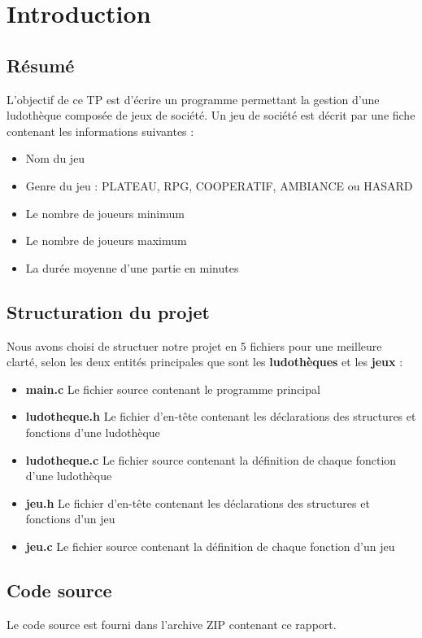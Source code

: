 \chapter{Introduction}
\section{Résumé}
L'objectif de ce TP est d'écrire un programme permettant la gestion d'une ludothèque composée de jeux de société. Un jeu de société est décrit par une fiche contenant les informations suivantes :
\begin{itemize}
  \item Nom du jeu
  \item Genre du jeu : PLATEAU, RPG, COOPERATIF, AMBIANCE ou HASARD
  \item Le nombre de joueurs minimum
  \item Le nombre de joueurs maximum
  \item La durée moyenne d'une partie en minutes
\end{itemize}

\section{Structuration du projet}
Nous avons choisi de structuer notre projet en 5 fichiers pour une meilleure clarté, selon les deux entités principales que sont les \textbf{ludothèques} et les \textbf{jeux} :

\begin{itemize}
  \item \textbf{main.c} Le fichier source contenant le programme principal
  \item \textbf{ludotheque.h} Le fichier d'en-tête contenant les déclarations des structures et fonctions d'une ludothèque
  \item \textbf{ludotheque.c} Le fichier source contenant la définition de chaque fonction d'une ludothèque
  \item \textbf{jeu.h} Le fichier d'en-tête contenant les déclarations des structures et fonctions d'un jeu
  \item \textbf{jeu.c} Le fichier source contenant la définition de chaque fonction d'un jeu
\end{itemize}

\section{Code source}
Le code source est fourni dans l'archive ZIP contenant ce rapport.